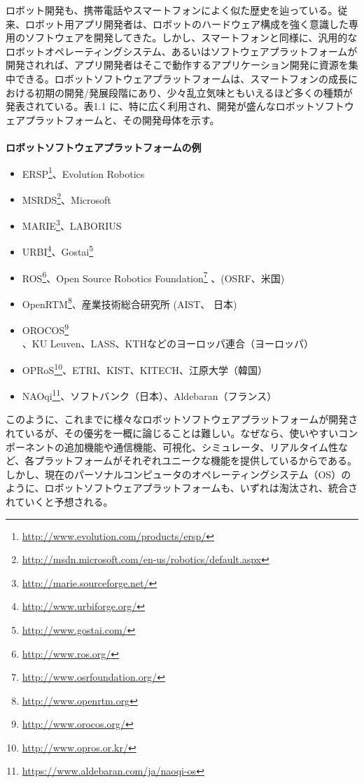 ロボット開発も、携帯電話やスマートフォンによく似た歴史を辿っている。従来、ロボット用アプリ開発者は、ロボットのハードウェア構成を強く意識した専用のソフトウェアを開発してきた。しかし、スマートフォンと同様に、汎用的なロボットオペレーティングシステム、あるいはソフトウェアプラットフォームが開発されれば、アプリ開発者はそこで動作するアプリケーション開発に資源を集中できる。ロボットソフトウェアプラットフォームは、スマートフォンの成長における初期の開発/発展段階にあり、少々乱立気味ともいえるほど多くの種類が発表されている。表1.1 に、特に広く利用され、開発が盛んなロボットソフトウェアプラットフォームと、その開発母体を示す。\\
\\
\textbf{ロボットソフトウェアプラットフォームの例}
\begin{itemize}[leftmargin=*]
\item ERSP\footnote{\url{http://www.evolution.com/products/ersp/}}、Evolution Robotics
\item MSRDS\footnote{\url{http://msdn.microsoft.com/en-us/robotics/default.aspx}}、Microsoft
\item MARIE\footnote{\url{http://marie.sourceforge.net/}}、LABORIUS
\item URBI\footnote{\url{http://www.urbiforge.org/}}、Gostai\footnote{\url{http://www.gostai.com/}}
\item ROS\footnote{\url{http://www.ros.org/}}、Open Source Robotics Foundation\footnote{\url{http://www.osrfoundation.org/}} 、(OSRF、米国)
\item OpenRTM\footnote{\url{http://www.openrtm.org}}、産業技術総合研究所 (AIST、 日本)
\item OROCOS\footnote{\url{http://www.orocos.org/}}、KU Leuven、LASS、KTHなどのヨーロッパ連合（ヨーロッパ）
\item OPRoS\footnote{\url{http://www.opros.or.kr/}}、ETRI、KIST、KITECH、江原大学（韓国）
\item NAOqi\footnote{\url{https://www.aldebaran.com/ja/naoqi-os}}、ソフトバンク（日本）、Aldebaran（フランス）
\end{itemize}
\vspace{1\baselineskip}
このように、これまでに様々なロボットソフトウェアプラットフォームが開発されているが、その優劣を一概に論じることは難しい。なぜなら、使いやすいコンポーネントの追加機能や通信機能、可視化、シミュレータ、リアルタイム性など、各プラットフォームがそれぞれユニークな機能を提供しているからである。しかし、現在のパーソナルコンピュータのオペレーティングシステム（OS）のように、ロボットソフトウェアプラットフォームも、いずれは淘汰され、統合されていくと予想される。

